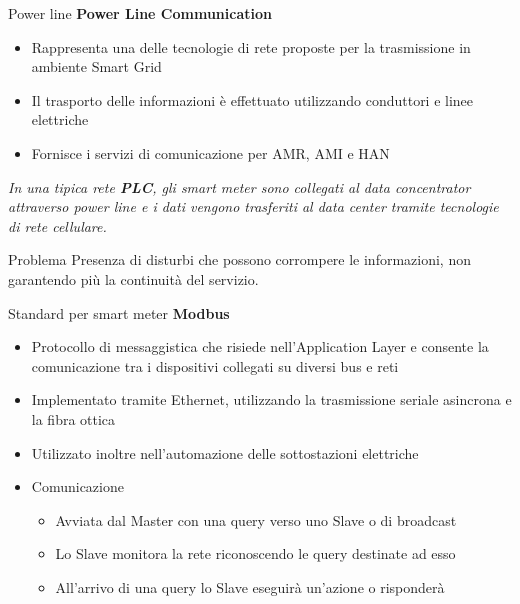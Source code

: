 \begin{frame}{Power line}
	\textbf{Power Line Communication}
	\begin{itemize}[<+- | alert@+>]
		\item Rappresenta una delle tecnologie di rete proposte per la trasmissione in ambiente Smart Grid
		\item Il trasporto delle informazioni è effettuato utilizzando conduttori e linee elettriche %
		\item Fornisce i servizi di comunicazione per AMR, AMI e HAN
	\end{itemize}
	\pause
	\begin{block}{}
		\textit{In una tipica rete \textbf{\color{blue_slides}PLC}, gli smart meter sono collegati al data concentrator attraverso power line e i dati vengono trasferiti al data center tramite tecnologie di rete cellulare.}
	\end{block}
	\pause
	\begin{block}{Problema}
		Presenza di disturbi che possono corrompere le informazioni, non garantendo più la continuità del servizio.
	\end{block}
\end{frame}

\begin{frame}{Standard per smart meter}
	\textbf{Modbus}
	\begin{itemize}[<+- | alert@+>]
		\item Protocollo di messaggistica che risiede nell'Application Layer e consente la comunicazione tra i dispositivi collegati su diversi bus e reti
		\item Implementato tramite Ethernet, utilizzando la trasmissione seriale asincrona e la fibra ottica
		\item Utilizzato inoltre nell'automazione delle sottostazioni elettriche
		\item Comunicazione
			\begin{itemize}[<+- | alert@+>]
			\item Avviata dal Master con una query verso uno Slave o di broadcast
			\item Lo Slave monitora la rete riconoscendo le query destinate ad esso
			\item All'arrivo di una query lo Slave eseguirà un'azione o risponderà
			\end{itemize}
	\end{itemize}
\end{frame}

